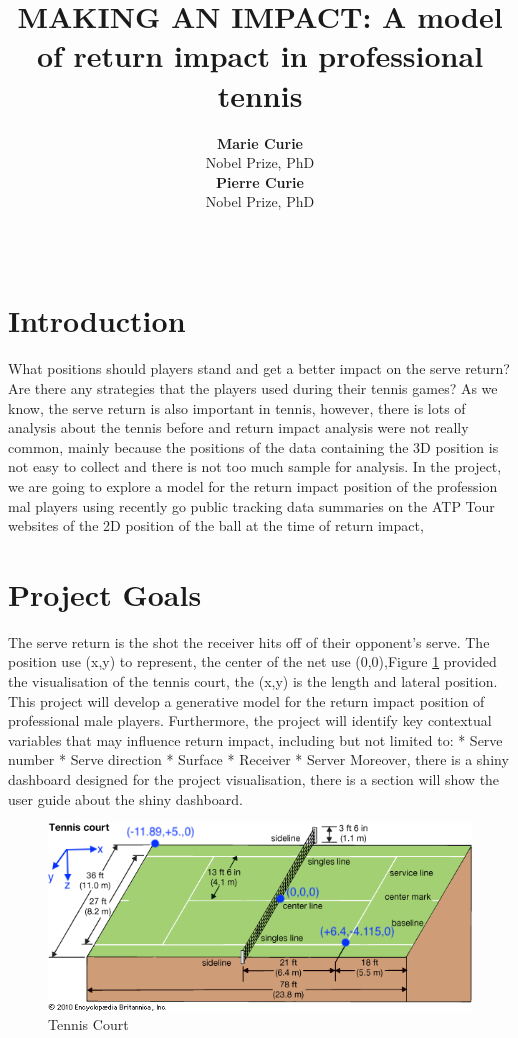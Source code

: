 \documentclass[11pt,a4paper,]{article}
\title{MAKING AN IMPACT: A model of return impact in professional tennis}
\author{\sf\Large\textbf{ Marie Curie}\\ {\sf\large Nobel Prize, PhD\\[0.5cm]} \sf\Large\textbf{ Pierre Curie}\\ {\sf\large Nobel Prize, PhD\\[0.5cm]}}
\date{\sf\Date~\Month~\Year}
\makeatletter
\def\titlepage{\front{\expandafter{\@title}}{\@author}{\@organization}}
\makeatother
\begin{document}
\titlepage

\clearpage

\hypertarget{introduction}{%
\section{Introduction}\label{introduction}}

What positions should players stand and get a better impact on the serve return? Are there any strategies that the players used during their tennis games? As we know, the serve return is also important in tennis, however, there is lots of analysis about the tennis before and return impact analysis were not really common, mainly because the positions of the data containing the 3D position is not easy to collect and there is not too much sample for analysis. In the project, we are going to explore a model for the return impact position of the profession mal players using recently go public tracking data summaries on the ATP Tour websites of the 2D position of the ball at the time of return impact,

\hypertarget{project-goals}{%
\section{Project Goals}\label{project-goals}}

The serve return is the shot the receiver hits off of their opponent's serve. The position use (x,y) to represent, the center of the net use (0,0),Figure \ref{fig:court} provided the visualisation of the tennis court, the (x,y) is the length and lateral position. This project will develop a generative model for the return impact position of professional male players. Furthermore, the project will identify key contextual variables that may influence return impact, including but not limited to:
* Serve number
* Serve direction
* Surface
* Receiver
* Server
Moreover, there is a shiny dashboard designed for the project visualisation, there is a section will show the user guide about the shiny dashboard.

\begin{figure}
\includegraphics[width=1\linewidth]{image/tennis_court} \caption{Tennis Court}\label{fig:court}
\end{figure}
\end{document}
